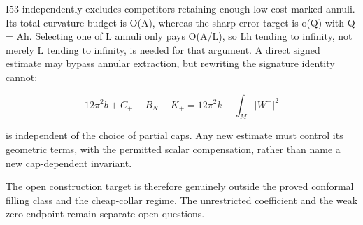 \documentclass[
  10pt,
]{article}
\begin{document}
I53 independently excludes competitors retaining enough low-cost marked
annuli. Its total curvature budget is O(A), whereas the sharp error
target is o(Q) with Q = Ah. Selecting one of L annuli only pays O(A/L),
so Lh tending to infinity, not merely L tending to infinity, is needed
for that argument. A direct signed estimate may bypass annular
extraction, but rewriting the signature identity cannot:

\[
 12\pi^2b+C_+-B_N-K_+
                   =12\pi^2k-\int_M|W^-|^2
\]

is independent of the choice of partial caps. Any new estimate must
control its geometric terms, with the permitted scalar compensation,
rather than name a new cap-dependent invariant.

The open construction target is therefore genuinely outside the proved
conformal filling class and the cheap-collar regime. The unrestricted
coefficient and the weak zero endpoint remain separate open questions.
\end{document}
